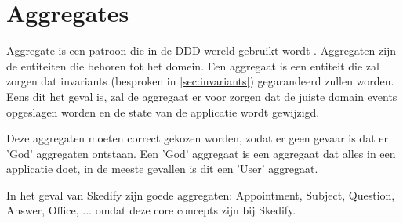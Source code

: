 
\section{Aggregates}
\label{sec:aggregates}

Aggregate is een patroon die in de \gls{DDD} wereld gebruikt wordt \autocite{FowlerAggregate}. Aggregaten zijn de entiteiten die behoren tot het domein. Een aggregaat is een entiteit die zal zorgen dat invariants (besproken in \ref{sec:invariants}) gegarandeerd zullen worden. Eens dit het geval is, zal de aggregaat er voor zorgen dat de juiste domain events opgeslagen worden en de state van de applicatie wordt gewijzigd.

Deze aggregaten moeten correct gekozen worden, zodat er geen gevaar is dat er 'God' aggregaten ontstaan. Een 'God' aggregaat is een aggregaat dat alles in een applicatie doet, in de meeste gevallen is dit een 'User' aggregaat.

In het geval van Skedify zijn goede aggregaten: Appointment, Subject, Question, Answer, Office, ... omdat deze core concepts zijn bij Skedify.